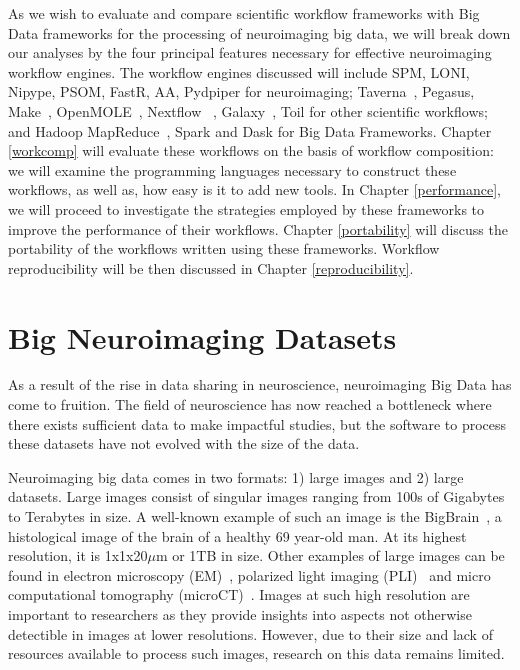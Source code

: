 \documentclass{report}
\begin{document}
        As we wish to evaluate and compare scientific workflow frameworks with
        Big Data frameworks for the processing of neuroimaging big data, we will
        break down our analyses by the four principal features necessary for
        effective neuroimaging workflow engines. The workflow engines discussed
        will include SPM, LONI, Nipype, PSOM, FastR, AA, Pydpiper 
        for neuroimaging; Taverna~\cite{doi:10.1093/bioinformatics/bth361}, 
        Pegasus, Make~\cite{10.3389/fninf.2016.00002}, 
        OpenMOLE~\cite{passerat2014openmole}, Nextflow~\cite{Di-Tommaso:2017aa}
        , Galaxy~\cite{Goecks2010}, 
        Toil for other scientific workflows; and Hadoop 
        MapReduce~\cite{Dean:2008:MSD:1327452.1327492}, Spark and Dask for
        Big Data Frameworks. Chapter \ref{workcomp} will evaluate these 
        workflows on the basis of workflow composition: we will %
        examine the programming languages necessary to construct these workflows,
        as well as, how easy is it to add new tools. In Chapter 
        \ref{performance}, we will proceed to 
        investigate the strategies employed by these frameworks to improve the 
        performance of their workflows. Chapter \ref{portability} will discuss
        the portability of the workflows written using these frameworks. 
        Workflow reproducibility will be then discussed in Chapter 
        \ref{reproducibility}.
        

        \section{Big Neuroimaging Datasets}\label{datasets}

            As a result of the rise in data sharing in neuroscience, 
            neuroimaging
            Big Data has come to fruition. The field of neuroscience has now
            reached a bottleneck where there exists sufficient data to make
            impactful studies, but the software to process these datasets have 
            not evolved with the size of the data.

            Neuroimaging big data comes in two formats: 1) large images and 2) 
            large datasets. Large images consist of singular images ranging 
            from 100s of Gigabytes to Terabytes in size. A well-known example 
            of 
            such an image is the BigBrain~\cite{Amunts1472}, a histological 
            image 
            of the brain of a healthy 69 year-old man. At its highest resolution,
            it is 1x1x20$\mu$m or 1TB in
            size. Other examples of large images can be found in electron 
            microscopy (EM)~\cite{Hildebrand:2017aa}, polarized light imaging 
            (PLI)~\cite{10.1007/978-3-319-12084-3_1} and micro computational
            tomography (microCT)~\cite{10.1371/journal.pone.0035691}. 
            Images at 
            such high resolution are important to researchers as they provide 
            insights into aspects not otherwise detectible in images at lower 
            resolutions. However, due to their size and lack of resources 
            available to process such images, research on this data remains 
            limited.
\end{document}
